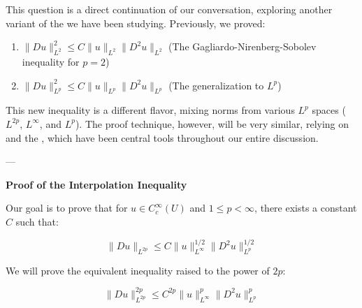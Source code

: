 This question is a direct continuation of our conversation, exploring another variant of the  we have been studying. Previously, we proved:

\begin{enumerate}
\item  $\|Du\|_{L^2}^2 \le C\|u\|_{L^2}\|D^2u\|_{L^2}$ (The Gagliardo-Nirenberg-Sobolev inequality for $p=2$)
\item  $\|Du\|_{L^p}^2 \le C\|u\|_{L^p}\|D^2u\|_{L^p}$ (The generalization to $L^p$)
\end{enumerate}

This new inequality is a different flavor, mixing norms from various $L^p$ spaces ($L^{2p}$, $L^\infty$, and $L^p$). The proof technique, however, will be very similar, relying on  and the , which have been central tools throughout our entire discussion.

---

\textbf{Proof of the Interpolation Inequality}

Our goal is to prove that for $u \in C_c^\infty(U)$ and $1 \le p < \infty$, there exists a constant $C$ such that:

$$\|Du\|_{L^{2p}} \le C\|u\|_{L^\infty}^{1/2}\|D^2u\|_{L^p}^{1/2}$$

We will prove the equivalent inequality raised to the power of $2p$:

$$\|Du\|_{L^{2p}}^{2p} \le C^{2p} \|u\|_{L^\infty}^{p}\|D^2u\|_{L^p}^{p}$$

